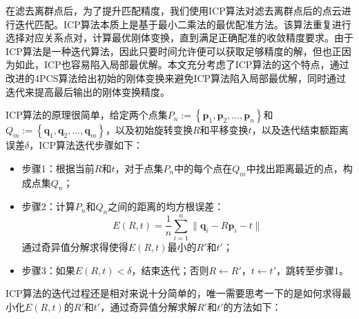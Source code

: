 在滤去离群点后，为了提升匹配精度，我们使用ICP算法对滤去离群点后的点云进行迭代匹配。ICP算法本质上是基于最小二乘法的最优配准方法。该算法重复进行选择对应关系点对，计算最优刚体变换，直到满足正确配准的收敛精度要求。由于ICP算法是一种迭代算法，因此只要时间允许便可以获取足够精度的解，但也正因为如此，ICP也容易陷入局部最优解。本文充分考虑了ICP算法的这个特点，通过改进的4PCS算法给出初始的刚体变换来避免ICP算法陷入局部最优解，同时通过迭代来提高最后输出的刚体变换精度。

ICP算法的原理很简单，给定两个点集$P_n:=\left\{\mathbf{p}_1,\mathbf{p}_2,\ldots,\mathbf{p}_n\right\}$和$Q_m:=\left\{\mathbf{q}_1,\mathbf{q}_2,\ldots,\mathbf{q}_m\right\}$，以及初始旋转变换$R$和平移变换$t$，以及迭代结束额距离误差$\delta$，ICP算法迭代步骤如下：
\begin{itemize}
\item {\kai 步骤1：}根据当前$R$和$t$，对于点集$P_n$中的每个点在$Q_m$中找出距离最近的点，构成点集$Q_n$；
\item {\kai 步骤2：}计算$P_n$和$Q_n$之间的距离的均方根误差：
  \begin{equation}
    E(R,t) = \frac{1}{n}\sum_{i=1}^n{\parallel \mathbf{q}_i - R\mathbf{p}_i - t\parallel}
  \end{equation}
  通过奇异值分解求得使得$E(R,t)$最小的$R'$和$t'$；
\item {\kai 步骤3：}如果$E(R,t) < \delta$，结束迭代；否则$R\leftarrow R'$，$t\leftarrow t'$，跳转至步骤1。
\end{itemize}

ICP算法的迭代过程还是相对来说十分简单的，唯一需要思考一下的是如何求得最小化$E(R,t)$的$R'$和$t'$，通过奇异值分解求解$R'$和$t'$的方法如下：

